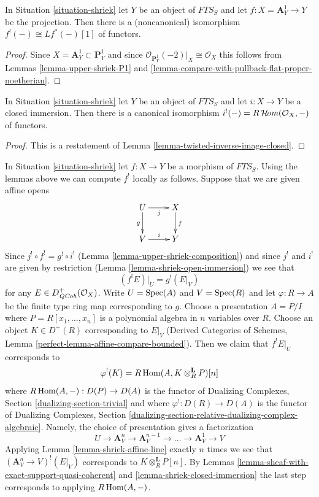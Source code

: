 \begin{lemma}
\label{lemma-shriek-affine-line}
In Situation \ref{situation-shriek} let $Y$ be an object of $\textit{FTS}_S$
and let $f : X = \mathbf{A}^1_Y \to Y$ be
the projection. Then there is a (noncanonical) isomorphism
$f^!(-) \cong Lf^*(-) [1]$ of functors.
\end{lemma}

\begin{proof}
Since $X = \mathbf{A}^1_Y \subset \mathbf{P}^1_Y$
and since $\mathcal{O}_{\mathbf{P}^1_Y}(-2)|_X \cong \mathcal{O}_X$
this follows from Lemmas \ref{lemma-upper-shriek-P1} and
\ref{lemma-compare-with-pullback-flat-proper-noetherian}.
\end{proof}

\begin{lemma}
\label{lemma-shriek-closed-immersion}
In Situation \ref{situation-shriek} let $Y$ be an object of
$\textit{FTS}_S$ and let $i : X \to Y$ be a closed immersion.
Then there is a canonical isomorphism
$i^!(-) = R\mathop{\mathcal{H}\!\mathit{om}}\nolimits(\mathcal{O}_X, -)$ of functors.
\end{lemma}

\begin{proof}
This is a restatement of Lemma \ref{lemma-twisted-inverse-image-closed}.
\end{proof}

\begin{remark}
\label{remark-local-calculation-shriek}
In Situation \ref{situation-shriek} let $f : X \to Y$ be a morphism of
$\textit{FTS}_S$. Using the lemmas above we can compute
$f^!$ locally as follows. Suppose that we are given affine opens
$$
\xymatrix{
U \ar[r]_j \ar[d]_g & X \ar[d]^f \\
V \ar[r]^i & Y
}
$$
Since $j^! \circ f^! = g^! \circ i^!$
(Lemma \ref{lemma-upper-shriek-composition})
and since $j^!$ and $i^!$ are given by restriction
(Lemma \ref{lemma-shriek-open-immersion})
we see that
$$
(f^!E)|_U = g^!(E|_V)
$$
for any $E \in D^+_{\mathit{QCoh}}(\mathcal{O}_X)$. Write
$U = \mathop{\mathrm{Spec}}(A)$ and $V = \mathop{\mathrm{Spec}}(R)$ and let $\varphi : R \to A$
be the finite type ring map corresponding to $g$.
Choose a presentation $A = P/I$ where $P = R[x_1, \ldots, x_n]$
is a polynomial algebra in $n$ variables over $R$. Choose an
object $K \in D^+(R)$ corresponding to $E|_V$
(Derived Categories of Schemes, Lemma
\ref{perfect-lemma-affine-compare-bounded}).
Then we claim that $f^!E|_U$ corresponds to
$$
\varphi^!(K) = R\mathop{\mathrm{Hom}}\nolimits(A, K \otimes_R^\mathbf{L} P)[n]
$$
where $R\mathop{\mathrm{Hom}}\nolimits(A, -) : D(P) \to D(A)$ is the functor of
Dualizing Complexes, Section \ref{dualizing-section-trivial}
and where $\varphi^! : D(R) \to D(A)$ is the functor of
Dualizing Complexes, Section
\ref{dualizing-section-relative-dualizing-complex-algebraic}.
Namely, the choice of presentation
gives a factorization
$$
U \rightarrow \mathbf{A}^n_V \to \mathbf{A}^{n - 1}_V \to \ldots \to
\mathbf{A}^1_V \to V
$$
Applying Lemma \ref{lemma-shriek-affine-line} exactly $n$ times we see that
$(\mathbf{A}^n_V \to V)^!(E|_V)$ corresponds to
$K \otimes_R^\mathbf{L} P[n]$. By Lemmas
\ref{lemma-sheaf-with-exact-support-quasi-coherent} and
\ref{lemma-shriek-closed-immersion} the last step corresponds to
applying $R\mathop{\mathrm{Hom}}\nolimits(A, -)$.
\end{remark}

